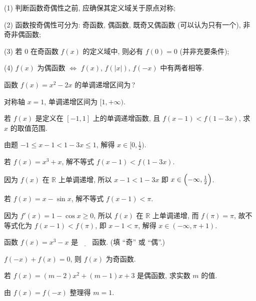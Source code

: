   (1) 判断函数奇偶性之前, 应确保其定义域关于原点对称;
  
  (2) 函数按奇偶性可分为: 奇函数, 偶函数, 既奇又偶函数 (可以认为只有一个), 非奇非偶函数;
  
  (3) 若 $0$ 在奇函数 $f(x)$ 的定义域中, 则必有 $f(0)=0$ (并非充要条件);
  
  (4) $f(x)$ 为偶函数 $\Leftrightarrow$ $f(x)$, $f(|x|)$, $f(-x)$ 中有两者相等.

  \lianxi
  \begin{exercise}
    函数 $f(x)= x^2-2x$ 的单调递增区间为\,?
  \end{exercise}
  
  \beginsolution
    对称轴 $x=1$, 单调递增区间为 $[1,+\infty)$.
  \endsolution
  
  \begin{exercise}
    若 $f(x)$ 是定义在 $[-1,1]$ 上的单调递增函数, 
    且 $f(x-1)<f(1-3x)$, 求 $x$ 的取值范围.
  \end{exercise}
  
  \beginsolution
    由题 $-1\leqslant x-1<1-3x\leqslant 1$, 解得 $x\in\Big[0,\frac12\Big)$.
    
    \varexercise 若 $f(x)=x^3+x$, 解不等式 $f(x-1)<f(1-3x)$.
    
    因为 $f(x)$ 在 $\mathbb{R}$ 上单调递增, 所以 $x-1<1-3x$ 即 $x\in\Bigl(-\infty,\frac12\Bigr)$.
    
    \varexercise 若 $f(x)=x-\sin x$, 解不等式 $f(x-1)<\pi$.
    
    因为 $f'(x)=1-\cos x\geqslant 0$, 所以 $f(x)$ 在 $\mathbb{R}$ 上单调递增, 而 $f(\pi)=\pi$, 故不等式化为 $f(x-1)<f(\pi)$, 即 $x-1<\pi$, 解得 $x\in(-\infty,\pi+1)$.
  \endsolution
  
  \begin{exercise}
    函数 $f(x)=x^3 -x$ 是$\underline{\qquad}$函数. (填 ``奇'' 或 ``偶''.)
  \end{exercise}
  
  \beginsolution
    $f(-x)+f(x)=0$, 则 $f(x)$ 为奇函数.
  \endsolution
  
  \begin{exercise}
    若 $f(x)=(m-2)x^2 +(m-1)x+3$ 是偶函数, 求实数 $m$ 的值.
  \end{exercise}
  
  \beginsolution
    由 $f(x)=f(-x)$ 整理得 $m=1$.
  \endsolution
  
